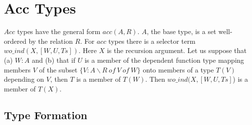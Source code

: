 \documentclass[11pt]{report}
\newcommand{\inv}[1]{\index{#1}}
\begin{document}
 \section{Acc Types}
 \inv{acc type}
  
 $Acc$ types have the general form $acc(A,R)$. $A$, the base type, is a set
 well-ordered by the relation $R$. For $acc$ types there is a selector term
 $wo\_ind(X,[W,U,Ts])$. Here $X$ is the recursion argument. Let us suppose
 that (a) $W:A$ and (b) that if $U$ is a member of the dependent function
 type mapping members $V$ of the subset $\{V:A \backslash R\ of\ V\ of\ W\}$
 onto members of a type $T(V)$ depending on $V$, then $T$ is a member of
 $T(W)$. Then $wo\_ind(X,[W,U,Ts]$) is a member of $T(X)$.
 
 \subsection{Type Formation}
  
\end{document}
